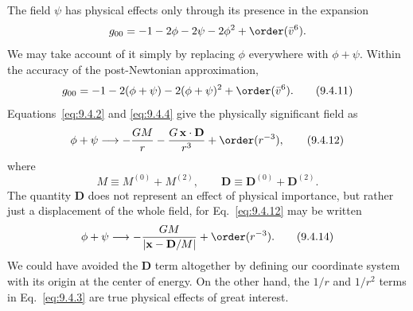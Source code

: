 The field \(\psi\) has physical effects only through its presence in the
expansion
\[
  g_{00}=-1-2\phi-2\psi-2\phi^2+\order(\bar v^6).
\]
We may take account of it simply by replacing \(\phi\) everywhere with
\(\phi+\psi\). Within the accuracy of the post-Newtonian approximation,
\begin{equation}
  g_{00}
  =
  -1-2(\phi+\psi)-2(\phi+\psi)^2+\order(\bar v^6).
  \tag{9.4.11}\label{eq:9.4.11}
\end{equation}
Equations~\eqref{eq:9.4.2} and \eqref{eq:9.4.4} give the physically
significant field as
\begin{equation}
  \phi+\psi
  \longrightarrow
  -\frac{GM}{r}
  -\frac{G\,\mathbf x\cdot\mathbf D}{r^3}
  +\order(r^{-3}),
  \tag{9.4.12}\label{eq:9.4.12}
\end{equation}
where
\begin{equation}
  M\equiv M^{(0)}+M^{(2)},
  \qquad
  \mathbf D\equiv\mathbf D^{(0)}+\mathbf D^{(2)}.
  \tag{9.4.13}\label{eq:9.4.13}
\end{equation}
The quantity \(\mathbf D\) does not represent an effect of physical
importance, but rather just a displacement of the whole field, for
Eq.~\eqref{eq:9.4.12} may be written
\begin{equation}
  \phi+\psi
  \longrightarrow
  -\frac{GM}{|\mathbf x-\mathbf D/M|}
  +\order(r^{-3}).
  \tag{9.4.14}\label{eq:9.4.14}
\end{equation}
We could have avoided the \(\mathbf D\) term altogether by defining our
coordinate system with its origin at the center of energy. On the other
hand, the \(1/r\) and \(1/r^2\) terms in Eq.~\eqref{eq:9.4.3} are true
physical effects of great interest.

